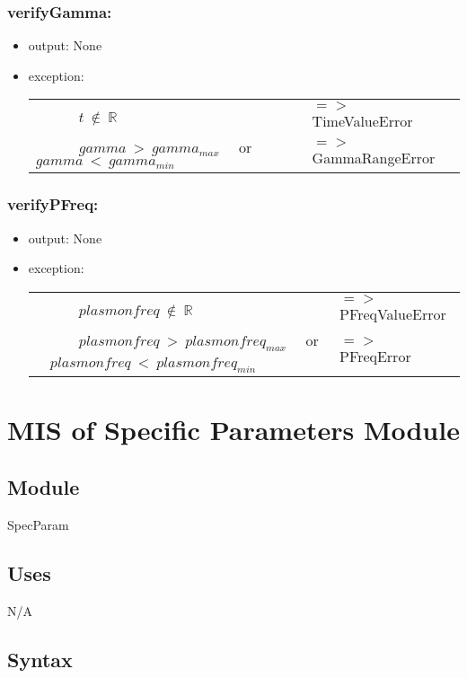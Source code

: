 \documentclass[12pt, titlepage]{article}
\begin{document}
\subsubsection*{verifyGamma:}
\begin{itemize}
	\item output: None
	\item exception: 
	\noindent \begin{longtable*}[l]{l l}
		\ \ \ \ \ \ $t\  \notin \  \mathbb{R}$ & $=>$ TimeValueError\\
		\ \ \ \ \ \ $ gamma\ >\ gamma_{max}$ \ \ or \ \ $gamma\ <\ gamma_{min}$ & $=>$ GammaRangeError\\
			\end{longtable*}
	
\end{itemize}


\subsubsection*{verifyPFreq:}
\begin{itemize}
	\item output: None
	\item exception: 
	\noindent \begin{longtable*}[l]{l l}
		\ \ \ \ \ \ $plasmonfreq\  \notin \  \mathbb{R}$ & $=>$ PFreqValueError\\
		\ \ \ \ \ \ $ plasmonfreq\ >\ plasmonfreq_{max}$ \ \ or \ \ $plasmonfreq\ <\ plasmonfreq_{min}$ & $=>$ PFreqError\\
	\end{longtable*}
	
\end{itemize}
\newpage
%
%
%
%
%
\section{MIS of Specific Parameters Module} \label{SPM} 


\subsection{Module}
SpecParam

\subsection{Uses}
N/A
\subsection{Syntax}
\end{document}
